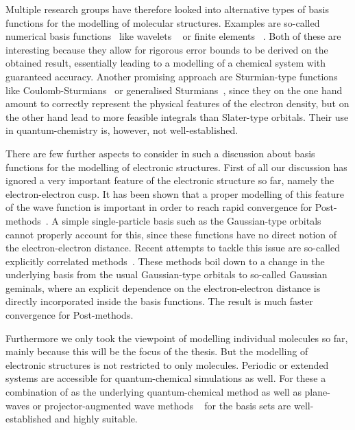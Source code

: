 Multiple research groups have therefore looked
into alternative types of basis functions
for the modelling of molecular structures.
Examples are so-called numerical basis functions~\cite{Frediani2015}
like wavelets%
~\cite{Bischoff2011,Bischoff2012,Bischoff2013,Bischoff2014,Bischoff2014a,Bischoff2017}
or finite elements%
~\cite{Tsuchida1995,Soler2002,Lehtovaara2009,Alizadegan2010,Avery2011PhD,Davydov2015,Boffi2016}.
Both of these are interesting because they allow for rigorous error bounds
to be derived on the obtained result,
essentially leading to a modelling of a chemical system with guaranteed accuracy.
Another promising approach are Sturmian-type functions
like Coulomb-Sturmians~\cite{Shull1959,Rotenberg1962,Rotenberg1970,Gruzdev1990,Hoggan2009,Randazzo2010}
or generalised Sturmians~\cite{Avery2006,Avery2011PhD,Avery2011,Morales2016,Avery2017,Randazzo2015,Granados2016},
since they on the one hand amount to correctly represent
the physical features of the electron density,
but on the other hand lead to more feasible integrals than Slater-type orbitals.
Their use in quantum-chemistry is, however, not well-established.

There are few further aspects to consider in such a discussion about basis functions
for the modelling of electronic structures.
First of all our discussion has ignored
a very important feature of the electronic structure so far,
namely the electron-electron cusp.
It has been shown that a proper modelling of this feature of the wave function
is important in order to reach rapid convergence for Post-\HF methods~\cite{Kong2012}.
A simple single-particle basis such as the Gaussian-type
orbitals cannot properly account for this,
since these functions have no direct notion of the electron-electron distance.
Recent attempts to tackle this issue are so-called
explicitly correlated methods~\cite{Kong2012}.
These methods boil down to a change in the underlying
basis from the usual Gaussian-type orbitals to so-called Gaussian geminals,
where an explicit dependence on the electron-electron
distance is directly incorporated inside the basis functions.
The result is much faster convergence for Post-\HF methods.

Furthermore we only took the viewpoint of modelling
individual molecules so far, mainly because this will be the focus of the thesis.
But the modelling of electronic structures is not restricted to only molecules.
Periodic or extended systems are accessible
for quantum-chemical simulations as well.
For these a combination of \DFT as the underlying quantum-chemical method
as well as plane-waves or projector-augmented wave methods%
~\cite{Kresse1996,Kresse1999,Mortensen2005,Enkovaara2010}
for the basis sets are well-established and highly suitable.

